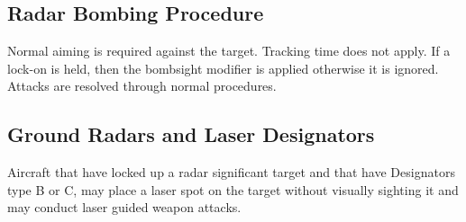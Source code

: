 \begin{advancedrules}
    \subsection{Radar Bombing Procedure} Normal aiming is required against the target. Tracking time does not apply. If a lock-on is held, then the bombsight modifier is applied otherwise it is ignored. Attacks are resolved through normal procedures.

    \subsection{Ground Radars and Laser Designators} Aircraft that have locked up a radar significant target and that have Designators type B or C, may place a laser spot on the target without visually sighting it and may conduct laser guided weapon attacks.


\end{advancedrules}
